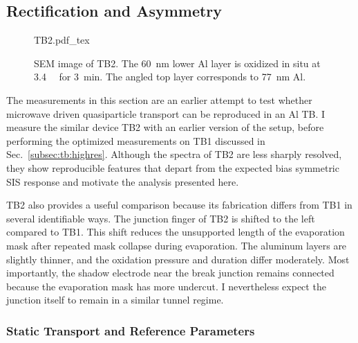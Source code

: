 \subsection{Rectification and Asymmetry}
\label{subsec:tb:asym}

    \begin{figure}
        \captionsetup{format=plain}%
        \centering
        \vspace{-1.0em}
        {
            \fontsize{7}{9}\selectfont
            {TB2.pdf_tex}
        }
        \vspace{-1.5em}
        \caption{
            SEM image of TB2. The \qty{60}{\nano\meter} lower Al layer is oxidized in situ at \qty{3.4}{\milli\barunit} for \qty{3}{\minute}. The angled top layer corresponds to \qty{77}{\nano\meter} Al.
        }
        \label{fig:tb:asym:image-TB2}
    \end{figure}

    The measurements in this section are an earlier attempt to test whether microwave driven quasiparticle transport can be reproduced in an Al TB. I measure the similar device TB2 with an earlier version of the setup, before performing the optimized measurements on TB1 discussed in Sec.~\ref{subsec:tb:highres}. Although the spectra of TB2 are less sharply resolved, they show reproducible features that depart from the expected bias symmetric SIS response and motivate the analysis presented here.

    TB2 also provides a useful comparison because its fabrication differs from TB1 in several identifiable ways. The junction finger of TB2 is shifted to the left compared to TB1. This shift reduces the unsupported length of the evaporation mask after repeated mask collapse during evaporation. The aluminum layers are slightly thinner, and the oxidation pressure and duration differ moderately. Most importantly, the shadow electrode near the break junction remains connected because the evaporation mask has more undercut. I nevertheless expect the junction itself to remain in a similar tunnel regime.

    \subsubsection*{Static Transport and Reference Parameters}
    \label{subsec:tb:asym:static}

